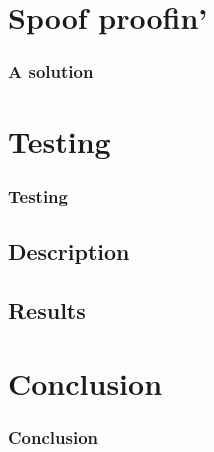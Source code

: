 \documentclass[xcolor=table]{beamer}
\begin{document}
\section{Spoof proofin'}
\begin{frame}
\frametitle{A solution}
\end{frame}

\section{Testing}
\begin{frame}
\frametitle{Testing}
  \subsection{Description}
  \subsection{Results}
\end{frame}

\section{Conclusion}
\begin{frame}
  \frametitle{Conclusion}
\end{frame}
\end{document}

